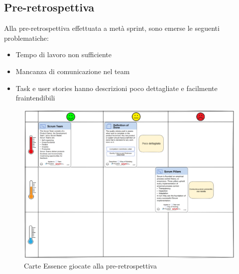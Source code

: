 \documentclass[11pt]{article}
\begin{document}
\subsection*{Pre-retrospettiva}
Alla pre-retrospettiva effettuata a metà sprint, sono emerse le seguenti problematiche:
\begin{itemize}
    \item Tempo di lavoro non sufficiente
    \item Mancanza di comunicazione nel team
    \item Task e user stories hanno descrizioni poco dettagliate e facilmente fraintendibili
\end{itemize}
\begin{figure}[H]
    \centering
    \includegraphics[width=12cm]{./img/preretrospettiva.png}
    \caption{Carte Essence giocate alla pre-retrospettiva}
\end{figure}

\newpage
\end{document}
